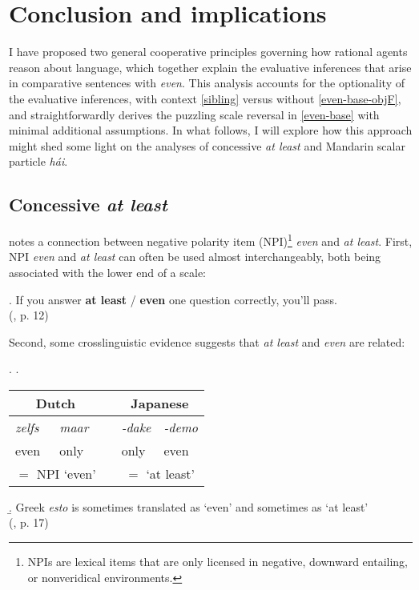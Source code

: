 \documentclass[12pt,letterpaper]{scrartcl}
\newcommand{\alignright}{\hspace*{\fill}}
\begin{document}
\section{Conclusion and implications}

I have proposed two general cooperative principles governing how rational agents reason about language, which together explain the evaluative inferences that arise in comparative sentences with \textit{even}. This analysis accounts for the optionality of the evaluative inferences, with context \ref{sibling} versus without \ref{even-base-objF}, and straightforwardly derives the puzzling scale reversal in \ref{even-base} with minimal additional assumptions. In what follows, I will explore how this approach might shed some light on the analyses of concessive \textit{at least} and Mandarin scalar particle \textit{h\'{a}i}.

\subsection{Concessive \textit{at least}} 


\cite{rullmann_more_2009} notes a connection between negative polarity item (NPI)\footnote{NPIs are lexical items that are only licensed in negative, downward entailing, or nonveridical environments.} \textit{even} and \textit{at least}. First, NPI \textit{even} and \textit{at least} can often be used almost interchangeably, both being associated with the lower end of a scale:

\ex. If you answer \textbf{at least} / \textbf{even} one question correctly, you'll pass. \\ \alignright (\cite{rullmann_more_2009}, p. 12)

Second, some crosslinguistic evidence suggests that \textit{at least} and \textit{even} are related:

\ex. \a. \begin{tabular}[t]{llp{1cm}ll}
\multicolumn{2}{c}{Dutch} & & \multicolumn{2}{c}{Japanese} \\\hline
\textit{zelfs} & \textit{maar} & & \textit{-dake} & \textit{-demo}\\
even & only & & only & even\\
\multicolumn{2}{c}{$=$ NPI `even'} & & \multicolumn{2}{c}{$=$ `at least'}        
\end{tabular}
\b. Greek \textit{esto} is sometimes translated as `even' and sometimes as `at least' \\ \alignright (\cite{rullmann_more_2009}, p. 17)
\end{document}
